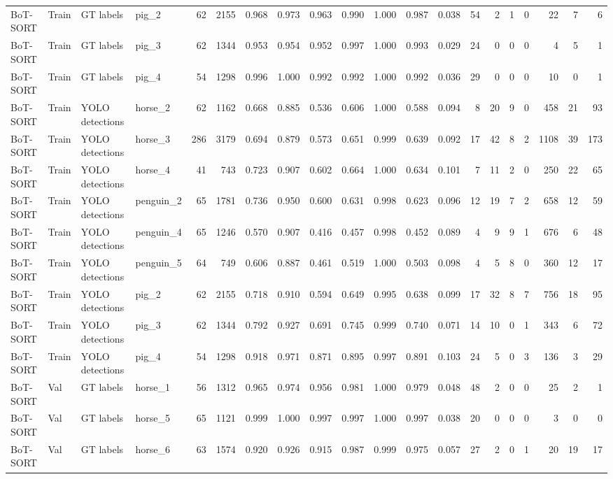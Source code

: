 \begin{table}
\begin{tabular}{llllrrrrrrrrrrrrrrrr}
BoT-SORT & Train & GT labels & pig_2 & 62 & 2155 & 0.968 & 0.973 & 0.963 & 0.990 & 1.000 & 0.987 & 0.038 & 54 & 2 & 1 & 0 & 22 & 7 & 6 \\
BoT-SORT & Train & GT labels & pig_3 & 62 & 1344 & 0.953 & 0.954 & 0.952 & 0.997 & 1.000 & 0.993 & 0.029 & 24 & 0 & 0 & 0 & 4 & 5 & 1 \\
BoT-SORT & Train & GT labels & pig_4 & 54 & 1298 & 0.996 & 1.000 & 0.992 & 0.992 & 1.000 & 0.992 & 0.036 & 29 & 0 & 0 & 0 & 10 & 0 & 1 \\
BoT-SORT & Train & YOLO detections & horse_2 & 62 & 1162 & 0.668 & 0.885 & 0.536 & 0.606 & 1.000 & 0.588 & 0.094 & 8 & 20 & 9 & 0 & 458 & 21 & 93 \\
BoT-SORT & Train & YOLO detections & horse_3 & 286 & 3179 & 0.694 & 0.879 & 0.573 & 0.651 & 0.999 & 0.639 & 0.092 & 17 & 42 & 8 & 2 & 1108 & 39 & 173 \\
BoT-SORT & Train & YOLO detections & horse_4 & 41 & 743 & 0.723 & 0.907 & 0.602 & 0.664 & 1.000 & 0.634 & 0.101 & 7 & 11 & 2 & 0 & 250 & 22 & 65 \\
BoT-SORT & Train & YOLO detections & penguin_2 & 65 & 1781 & 0.736 & 0.950 & 0.600 & 0.631 & 0.998 & 0.623 & 0.096 & 12 & 19 & 7 & 2 & 658 & 12 & 59 \\
BoT-SORT & Train & YOLO detections & penguin_4 & 65 & 1246 & 0.570 & 0.907 & 0.416 & 0.457 & 0.998 & 0.452 & 0.089 & 4 & 9 & 9 & 1 & 676 & 6 & 48 \\
BoT-SORT & Train & YOLO detections & penguin_5 & 64 & 749 & 0.606 & 0.887 & 0.461 & 0.519 & 1.000 & 0.503 & 0.098 & 4 & 5 & 8 & 0 & 360 & 12 & 17 \\
BoT-SORT & Train & YOLO detections & pig_2 & 62 & 2155 & 0.718 & 0.910 & 0.594 & 0.649 & 0.995 & 0.638 & 0.099 & 17 & 32 & 8 & 7 & 756 & 18 & 95 \\
BoT-SORT & Train & YOLO detections & pig_3 & 62 & 1344 & 0.792 & 0.927 & 0.691 & 0.745 & 0.999 & 0.740 & 0.071 & 14 & 10 & 0 & 1 & 343 & 6 & 72 \\
BoT-SORT & Train & YOLO detections & pig_4 & 54 & 1298 & 0.918 & 0.971 & 0.871 & 0.895 & 0.997 & 0.891 & 0.103 & 24 & 5 & 0 & 3 & 136 & 3 & 29 \\
BoT-SORT & Val & GT labels & horse_1 & 56 & 1312 & 0.965 & 0.974 & 0.956 & 0.981 & 1.000 & 0.979 & 0.048 & 48 & 2 & 0 & 0 & 25 & 2 & 1 \\
BoT-SORT & Val & GT labels & horse_5 & 65 & 1121 & 0.999 & 1.000 & 0.997 & 0.997 & 1.000 & 0.997 & 0.038 & 20 & 0 & 0 & 0 & 3 & 0 & 0 \\
BoT-SORT & Val & GT labels & horse_6 & 63 & 1574 & 0.920 & 0.926 & 0.915 & 0.987 & 0.999 & 0.975 & 0.057 & 27 & 2 & 0 & 1 & 20 & 19 & 17 \\

\end{tabular}
\end{table}
